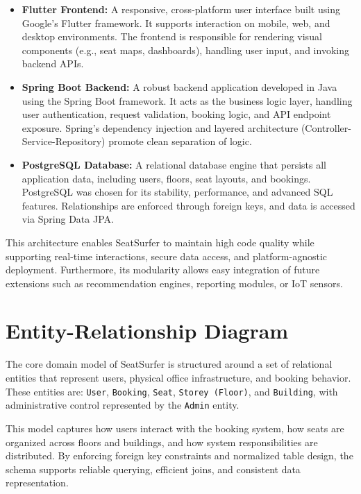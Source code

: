 \documentclass[12pt,a4paper]{report}
\begin{document}
\begin{itemize}
    \item \textbf{Flutter Frontend:} A responsive, cross-platform user interface built using Google's Flutter framework. It supports interaction on mobile, web, and desktop environments. The frontend is responsible for rendering visual components (e.g., seat maps, dashboards), handling user input, and invoking backend APIs.

    \item \textbf{Spring Boot Backend:} A robust backend application developed in Java using the Spring Boot framework. It acts as the business logic layer, handling user authentication, request validation, booking logic, and API endpoint exposure. Spring's dependency injection and layered architecture (Controller-Service-Repository) promote clean separation of logic.

    \item \textbf{PostgreSQL Database:} A relational database engine that persists all application data, including users, floors, seat layouts, and bookings. PostgreSQL was chosen for its stability, performance, and advanced SQL features. Relationships are enforced through foreign keys, and data is accessed via Spring Data JPA.
\end{itemize}

\noindent
This architecture enables SeatSurfer to maintain high code quality while supporting real-time interactions, secure data access, and platform-agnostic deployment. Furthermore, its modularity allows easy integration of future extensions such as recommendation engines, reporting modules, or IoT sensors.

\section{Entity-Relationship Diagram}

The core domain model of SeatSurfer is structured around a set of relational entities that represent users, physical office infrastructure, and booking behavior. These entities are: \texttt{User}, \texttt{Booking}, \texttt{Seat}, \texttt{Storey (Floor)}, and \texttt{Building}, with administrative control represented by the \texttt{Admin} entity.

This model captures how users interact with the booking system, how seats are organized across floors and buildings, and how system responsibilities are distributed. By enforcing foreign key constraints and normalized table design, the schema supports reliable querying, efficient joins, and consistent data representation.
\end{document}
